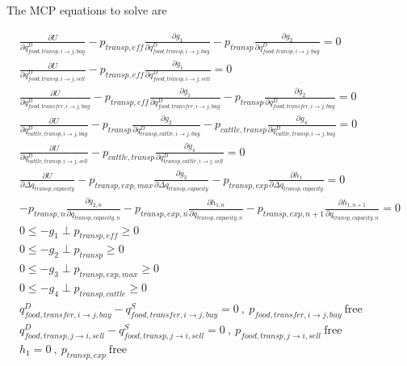 \documentclass[letter,12pt]{article}
\begin{document}
The MCP equations to solve are

\begin{gather}
\frac{\partial U}{\partial q_{food,transp,i \rightarrow j,buy}^D} - p_{transp,eff} \frac{\partial g_1}{\partial q_{food,transp,i \rightarrow j,buy}^D} - p_{transp} \frac{\partial g_2}{\partial q_{food,transp,i \rightarrow j,buy}^D} = 0 \\ 
\frac{\partial U}{\partial q_{food,transp,i \rightarrow j,sell}^D} - p_{transp,eff} \frac{\partial g_1}{\partial q_{food,transp,i \rightarrow j,sell}^D} = 0 \\ 
\frac{\partial U}{\partial q_{food,transfer,i \rightarrow j,buy}^D} - p_{transp,eff} \frac{\partial g_1}{\partial q_{food,transfer,i \rightarrow j,buy}^D} - p_{transp} \frac{\partial g_2}{\partial q_{food,transfer,i \rightarrow j,buy}^D} = 0 \\
\frac{\partial U}{\partial q_{cattle,transp,i \rightarrow j,buy}^D} - p_{transp} \frac{\partial g_2}{\partial q_{transp,cattle,i \rightarrow j,buy}^D} - p_{cattle,transp} \frac{\partial g_4}{\partial q_{cattle,transp,i \rightarrow j,buy}^D} = 0 \\
\frac{\partial U}{\partial q_{cattle,transp,i \rightarrow j,sell}^D} - p_{cattle,transp} \frac{\partial g_4}{\partial q_{transp,cattle,i \rightarrow j,sell}^D} = 0 \\ 
\frac{\partial U}{\partial \Delta q_{transp,capacity}} - p_{transp,exp,max} \frac{\partial g_3}{\partial \Delta q_{transp,capacity}} - p_{transp,exp} \frac{\partial h_1}{\partial \Delta q_{transp,capacity}} = 0 \\
-p_{transp,n}\frac{\partial g_{2,n}}{\partial q_{transp,capacity,n}} - p_{transp,exp,n} \frac{\partial h_{1,n}}{\partial q_{transp,capacity,n}} - p_{transp,exp,n+1} \frac{\partial h_{1,n+1}}{\partial q_{transp,capacity,n}} = 0 \\
0 \leq -g_1 \perp p_{transp,eff} \geq 0 \\
0 \leq -g_2 \perp p_{transp} \geq 0 \\
0 \leq -g_3 \perp p_{transp,exp,max} \geq 0 \\
0 \leq -g_4 \perp p_{transp,cattle} \geq 0 \\
q_{food,transfer,i \rightarrow j,buy}^D - q_{food,transfer,i \rightarrow j,buy}^S = 0 \ , \ p_{food,transfer,i \rightarrow j,buy} \ \text{free} \\
q_{food,transp,j \rightarrow i,sell}^D - q_{food,transp,j \rightarrow i,sell}^S = 0 \ , \ p_{food,transp,j \rightarrow i,sell} \ \text{free} \\
h_1 = 0 \ , \ p_{transp,exp} \ \text{free}
\end{gather}
\end{document}
